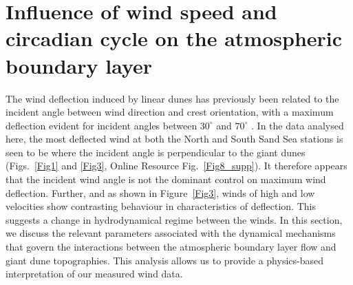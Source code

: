 \section{Influence of wind speed and circadian cycle on the atmospheric boundary layer}
The wind deflection induced by linear dunes has previously been related to the incident angle between wind direction and crest orientation, with a maximum deflection evident for incident angles between $30^{\circ}$ and $70^{\circ}$ \citep{Walker2009, Hesp2015}. In the data analysed here, the most deflected wind at both the North and South Sand Sea stations is seen to be where the incident angle is perpendicular to the giant dunes (Figs.~\ref{Fig1} and \ref{Fig3}, Online Resource Fig.~\ref{Fig8_supp}). It therefore appears that the incident wind angle is not the dominant control on maximum wind deflection. Further, and as shown in Figure~\ref{Fig3}, winds of high and low velocities show contrasting behaviour in characteristics of deflection. This suggests a change in hydrodynamical regime between the winds. In this section, we discuss the relevant parameters associated with the dynamical mechanisms that govern the interactions between the atmospheric boundary layer flow and giant dune topographies. This analysis allows us to provide a physics-based interpretation of our measured wind data.


